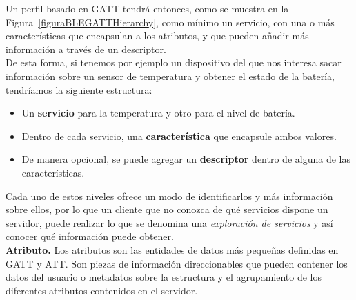 Un perfil basado en GATT tendrá entonces, como se muestra en la Figura~\ref{figuraBLEGATTHierarchy}, como mínimo un servicio, con una o más características que encapsulan a los atributos, y que pueden añadir más información a través de un descriptor.\\
De esta forma, si tenemos por ejemplo un dispositivo del que nos interesa sacar información sobre un sensor de temperatura y obtener el estado de la batería, tendríamos la siguiente estructura:
\begin{itemize}
	\item Un \textbf{servicio} para la temperatura y otro para el nivel de batería.
	\item Dentro de cada servicio, una \textbf{característica} que encapsule ambos valores.
	\item De manera opcional, se puede agregar un \textbf{descriptor} dentro de alguna de las características.
\end{itemize}
Cada uno de estos niveles ofrece un modo de identificarlos y más información sobre ellos, por lo que un cliente que no conozca de qué servicios dispone un servidor, puede realizar lo que se denomina una \textit{exploración de servicios} y así conocer qué información puede obtener.\\

\textbf{Atributo.} Los atributos son las entidades de datos más pequeñas definidas en GATT y ATT. Son piezas de información direccionables que pueden contener los datos del usuario o metadatos sobre la estructura y el agrupamiento de los diferentes atributos contenidos en el servidor.

